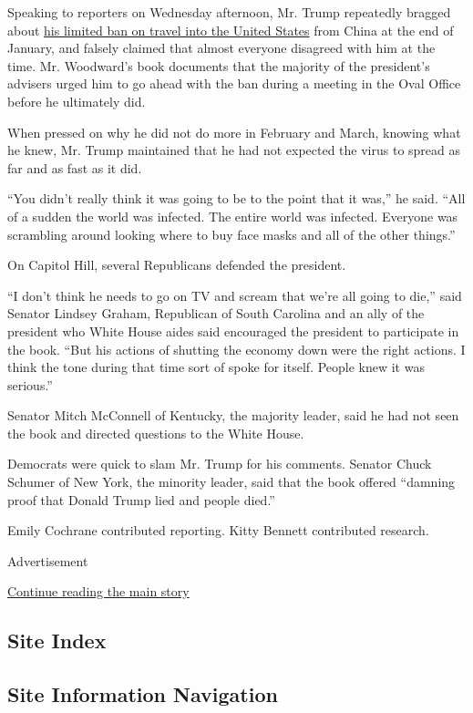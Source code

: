 Speaking to reporters on Wednesday afternoon, Mr. Trump repeatedly
bragged about
\href{https://www.nytimes3xbfgragh.onion/2020/01/31/business/china-travel-coronavirus.html}{his
limited ban on travel into the United States} from China at the end of
January, and falsely claimed that almost everyone disagreed with him at
the time. Mr. Woodward's book documents that the majority of the
president's advisers urged him to go ahead with the ban during a meeting
in the Oval Office before he ultimately did.

When pressed on why he did not do more in February and March, knowing
what he knew, Mr. Trump maintained that he had not expected the virus to
spread as far and as fast as it did.

``You didn't really think it was going to be to the point that it was,''
he said. ``All of a sudden the world was infected. The entire world was
infected. Everyone was scrambling around looking where to buy face masks
and all of the other things.''

On Capitol Hill, several Republicans defended the president.

``I don't think he needs to go on TV and scream that we're all going to
die,'' said Senator Lindsey Graham, Republican of South Carolina and an
ally of the president who White House aides said encouraged the
president to participate in the book. ``But his actions of shutting the
economy down were the right actions. I think the tone during that time
sort of spoke for itself. People knew it was serious.''

Senator Mitch McConnell of Kentucky, the majority leader, said he had
not seen the book and directed questions to the White House.

Democrats were quick to slam Mr. Trump for his comments. Senator Chuck
Schumer of New York, the minority leader, said that the book offered
``damning proof that Donald Trump lied and people died.''

Emily Cochrane contributed reporting. Kitty Bennett contributed
research.

Advertisement

\protect\hyperlink{after-bottom}{Continue reading the main story}

\hypertarget{site-index}{%
\subsection{Site Index}\label{site-index}}

\hypertarget{site-information-navigation}{%
\subsection{Site Information
Navigation}\label{site-information-navigation}}

